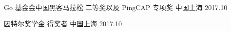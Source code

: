 
\begin{cvhonors}

  \cvhonor
    {Go 基金会中国黑客⻢拉松} %
    {二等奖以及 PingCAP 专项奖} %
    {中国上海} %
    {2017.10} %

  \cvhonor
    {因特尔奖学金} %
    {得奖者} %
    {中国上海} %
    {2017.10} %
\end{cvhonors}
